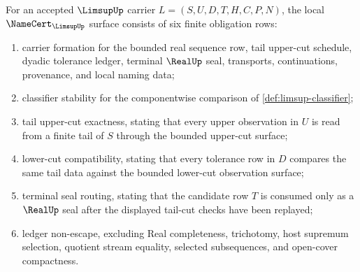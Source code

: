 \begin{theorem}
\label{thm:limsup-namecert-obligations}
For an accepted $\LimsupUp$ carrier $L=(S,U,D,T,H,C,P,N)$, the local $\NameCert_{\LimsupUp}$ surface consists of six finite obligation rows:
\begin{enumerate}
\item carrier formation for the bounded real sequence row, tail upper-cut schedule, dyadic tolerance ledger, terminal $\RealUp$ seal, transports, continuations, provenance, and local naming data;
\item classifier stability for the componentwise comparison of \autoref{def:limsup-classifier};
\item tail upper-cut exactness, stating that every upper observation in $U$ is read from a finite tail of $S$ through the bounded upper-cut surface;
\item lower-cut compatibility, stating that every tolerance row in $D$ compares the same tail data against the bounded lower-cut observation surface;
\item terminal seal routing, stating that the candidate row $T$ is consumed only as a $\RealUp$ seal after the displayed tail-cut checks have been replayed;
\item ledger non-escape, excluding Real completeness, trichotomy, host supremum selection, quotient stream equality, selected subsequences, and open-cover compactness.
\end{enumerate}
\end{theorem}
